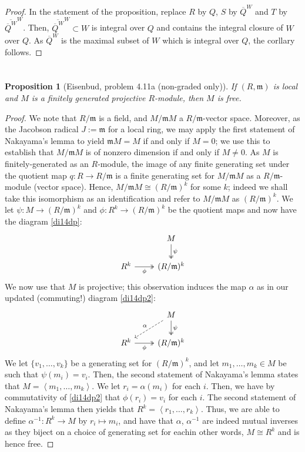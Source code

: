 \documentclass[english]{article}
\newcommand{\mfr}{\mathfrak{m}}
\newcommand{\prob}[1]{\setcounter{section}{#1-1}\section{}}
\newtheorem*{prop*}{Proposition}
\theoremstyle{remark}
\theoremstyle{definition}
\newcommand{\idl}[1]{\left\langle{#1}\right\rangle }
\begin{document}
\begin{proof}
In the statement of the proposition, replace $R$ by $Q$, $S$ by $\overline{Q}^W$ and $T$ by $\overline{{\overline{Q}}^W}^W$. Then, $\overline{{\overline{Q}}^W}^W\subset W$ is integral over $Q$ and contains the integral closure of $W$ over $Q$. As  $\overline{Q}^W$ is the maximal subset of $W$ which is integral over $Q$, the corllary follows. 
\end{proof}
\prob{14}
\begin{prop*}[Eisenbud, problem 4.11a (non-graded only)]
If $(R,\mfr)$ is local and $M$ is a finitely generated projective $R$-module, then $M$ is free. 
	\end{prop*}
\begin{proof}
	We note that $R/\mfr$ is a field, and $M/\mfr M$ a $R/\mfr$-vector space. Moreover, as the Jacobson radical $J:=\mfr$ for a local ring, we may apply the first statement of Nakayama's lemma to yield $\mfr M=M$ if and only if $M=0$; we use this to establish that $M/\mfr M$ is of nonzero dimension if and only if $M\neq 0$. As $M$ is finitely-generated as an $R$-module, the image of any finite generating set under the quotient map $q:R\to R/\mfr$ is a finite generating set for $M/\mfr M$ as a $R/\mfr$-module (vector space). Hence, $M/\mfr M\cong (R/\mfr)^k$ for some $k$; indeed we shall take this isomorphism as an identification and refer to $M/\mfr M$ as $(R/\mfr)^k$. We let $\psi:M\to (R/\mfr)^k$ and $\phi:R^k\to (R/\mfr)^k$ be the quotient maps and now have the diagram \eqref{di14dp}:
	\begin{equation}
		\label{di14dp} \begin{tikzcd}
		&M\arrow[d,"\psi",twoheadrightarrow]\\
		R^k\arrow[r,"\phi",twoheadrightarrow,swap]&(R/\mfr)^k
		\end{tikzcd}
	\end{equation}
	We now use that $M$ is projective; this observation induces the map $\alpha$ as in our updated (commuting!) diagram \eqref{di14dp2}:
		\begin{equation}
	\label{di14dp2} \begin{tikzcd}
	&M\arrow[d,"\psi",twoheadrightarrow]\arrow[dl,dashrightarrow,"\alpha",bend right=0,swap]\\
	R^k\arrow[r,"\phi",twoheadrightarrow,swap]&(R/\mfr)^k
	\end{tikzcd}
	\end{equation}
	We let $\{v_1,\hdots,v_k\}$ be a generating set for $(R/\mfr)^k$, and let $m_1,\hdots, m_k\in M$ be such that $\psi(m_i)=v_i$. Then, the second statement of Nakayama's lemma states that $M=\idl{m_1,\hdots,m_k}$. We let $r_i=\alpha(m_i)$ for each $i$. Then, we have by commutativity of \ref{di14dp2} that $\phi(r_i)=v_i$ for each $i$. The second statement of Nakayama's lemma then yields that $R^k=\idl{r_1,\hdots,r_k}$. Thus, we are able to define $\alpha^{-1}:R^k\to M$ by $r_i\mapsto m_i$, and have that $\alpha$, $\alpha^{-1}$ are indeed mutual inverses as they biject on a choice of generating set for each\textemdash in other words, $M\cong R^k$ and is hence free.
\end{proof}
\end{document}
